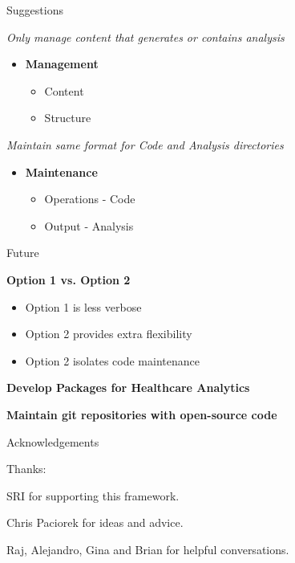 \documentclass{beamer}
\begin{document}
\begin{frame}{Suggestions}

\emph{Only manage content that generates or contains analysis}

\begin{itemize}
\item \textbf{Management}
\begin{itemize}
\item Content
\item Structure
\end{itemize}
\end{itemize}
\bigskip

\emph{ Maintain same format for  Code and Analysis directories}
\begin{itemize}
\item \textbf{Maintenance}
\begin{itemize}
\item Operations - Code
\item Output - Analysis
\end{itemize}

\end{itemize}

\end{frame}

\begin{frame}{Future}

\textbf{Option 1 vs. Option 2}
\begin{itemize}
\item Option 1 is less verbose
\item Option 2 provides extra flexibility
\item Option 2 isolates code maintenance
\end{itemize}
\bigskip

\textbf{Develop Packages for Healthcare Analytics}
\bigskip

\textbf{Maintain git repositories with open-source code}

\end{frame}

\begin{frame}{Acknowledgements}

Thanks:

\bigskip

SRI for supporting this framework.\\
\bigskip

Chris Paciorek for ideas and advice.\\
\bigskip

Raj, Alejandro, Gina and Brian for helpful conversations.\\
 
\end{frame}
\end{document}
